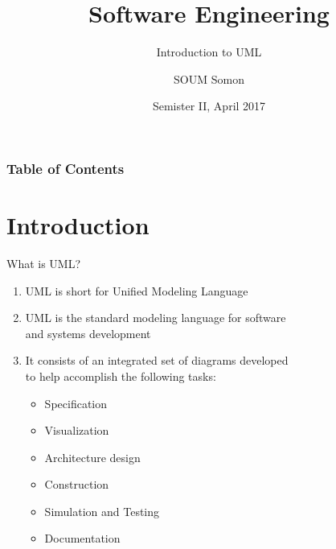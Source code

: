 \documentclass{beamer}
\title[Software Engineering] %
{Software Engineering}
\subtitle{Introduction to UML}
\author[SOUM Somon] %
{SOUM Somon}
\institute[Bc.CS] %
{ Institute of Technology of Cambodia }
\date[SE 2017] %
{Semister II, April 2017}
\begin{document}
	\begin{frame}
		\titlepage %
	\end{frame}
	\begin{frame}
		\frametitle{Table of Contents} %
		\tableofcontents %
	\end{frame}

\section{Introduction} %
\begin{frame}{What is UML?}
	\begin{enumerate}
		\item UML is short for Unified Modeling Language
		\item UML is the standard modeling language for software\\
		and systems development
		\item It consists of an integrated set of diagrams developed\\
		to help accomplish the following tasks:
			\begin{itemize}
				\item<1-> Specification
				\item<2-> Visualization
				\item<3-> Architecture design
				\item<4-> Construction
				\item<5-> Simulation and Testing
				\item<6-> Documentation
			\end{itemize}
		
	\end{enumerate}
\end{frame}
\end{document}

